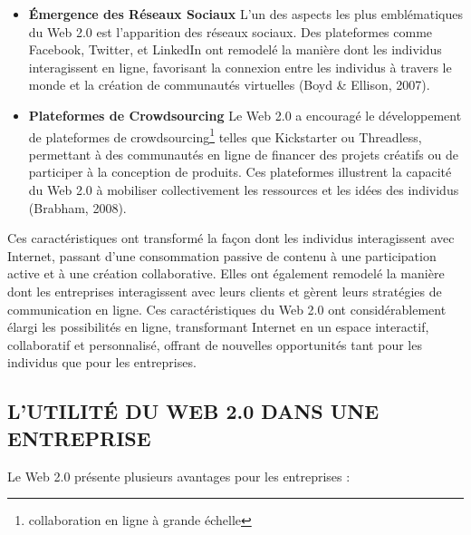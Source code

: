 \documentclass[12pt,a4paper]{article} %
\begin{document}
\begin{itemize}
		\item {\textbf{Émergence des Réseaux Sociaux}}
		L'un des aspects les plus emblématiques du Web 2.0 est l'apparition des réseaux sociaux. Des plateformes comme Facebook, Twitter, et LinkedIn ont remodelé la manière dont les individus interagissent en ligne, favorisant la connexion entre les individus à travers le monde et la création de communautés virtuelles (Boyd & Ellison, 2007).
		\item {\textbf{Plateformes de Crowdsourcing}}
		Le Web 2.0 a encouragé le développement de plateformes de crowdsourcing\footnote[6]{collaboration en ligne à grande échelle} telles que Kickstarter ou Threadless, permettant à des communautés en ligne de financer des projets créatifs ou de participer à la conception de produits. Ces plateformes illustrent la capacité du Web 2.0 à mobiliser collectivement les ressources et les idées des individus (Brabham, 2008).
	\end{itemize}
	Ces caractéristiques ont transformé la façon dont les individus interagissent avec Internet, passant d'une consommation passive de contenu à une participation active et à une création collaborative. Elles ont également remodelé la manière dont les entreprises interagissent avec leurs clients et gèrent leurs stratégies de communication en ligne. Ces caractéristiques du Web 2.0 ont considérablement élargi les possibilités en ligne, transformant Internet en un espace interactif, collaboratif et personnalisé, offrant de nouvelles opportunités tant pour les individus que pour les entreprises.
	
	\subsection{\textbf{L’UTILITÉ DU WEB 2.0 DANS UNE ENTREPRISE
				}}
			
			Le Web 2.0 présente plusieurs avantages pour les entreprises :
			
\end{document}
